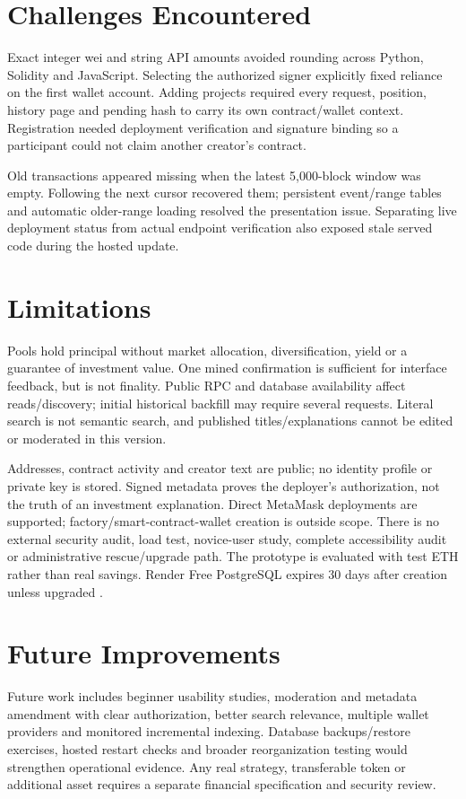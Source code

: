 \documentclass[10pt,a4paper]{article}
\begin{document}
\clearpage
\section{Challenges Encountered}
Exact integer wei and string API amounts avoided rounding across Python, Solidity and JavaScript. Selecting the authorized signer explicitly fixed reliance on the first wallet account. Adding projects required every request, position, history page and pending hash to carry its own contract/wallet context. Registration needed deployment verification and signature binding so a participant could not claim another creator's contract.

Old transactions appeared missing when the latest 5,000-block window was empty. Following the next cursor recovered them; persistent event/range tables and automatic older-range loading resolved the presentation issue. Separating live deployment status from actual endpoint verification also exposed stale served code during the hosted update.

\section{Limitations}
Pools hold principal without market allocation, diversification, yield or a guarantee of investment value. One mined confirmation is sufficient for interface feedback, but is not finality. Public RPC and database availability affect reads/discovery; initial historical backfill may require several requests. Literal search is not semantic search, and published titles/explanations cannot be edited or moderated in this version.

Addresses, contract activity and creator text are public; no identity profile or private key is stored. Signed metadata proves the deployer's authorization, not the truth of an investment explanation. Direct MetaMask deployments are supported; factory/smart-contract-wallet creation is outside scope. There is no external security audit, load test, novice-user study, complete accessibility audit or administrative rescue/upgrade path. The prototype is evaluated with test ETH rather than real savings. Render Free PostgreSQL expires 30 days after creation unless upgraded \cite{render}.

\section{Future Improvements}
Future work includes beginner usability studies, moderation and metadata amendment with clear authorization, better search relevance, multiple wallet providers and monitored incremental indexing. Database backups/restore exercises, hosted restart checks and broader reorganization testing would strengthen operational evidence. Any real strategy, transferable token or additional asset requires a separate financial specification and security review.
\end{document}
